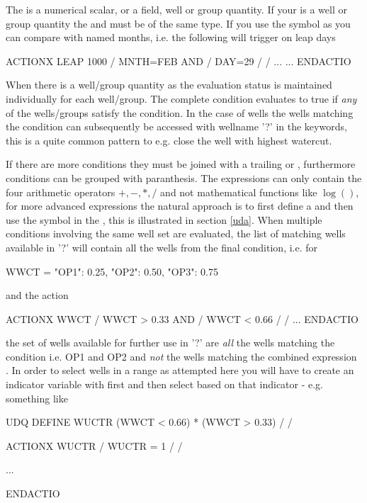 The  is a numerical scalar, or a field, well or group quantity.
If your  is a well or group quantity the  and
 must be of the same type. If you use the symbol  as
 you can compare with named months, i.e. the following will
trigger on leap days
\begin{deck}
ACTIONX
  LEAP 1000 /
  MNTH=FEB AND /
  DAY=29 /
/
...
...
ENDACTIO
\end{deck}
When there is a well/group quantity as  the evaluation status is
maintained individually for each well/group. The complete condition evaluates to
true if \emph{any} of the wells/groups satisfy the condition. In the case of
wells the wells matching the condition can subsequently be accessed with
wellname '?' in the  keywords, this is a quite common pattern to
e.g. close the well with highest watercut.

If there are more conditions they must be joined with a trailing  or
, furthermore conditions can be grouped with paranthesis. The \actionx{}
expressions can only contain the four arithmetic operators $+,-,*,/$ and not
mathematical functions like $\log()$, for more advanced expressions the natural
approach is to first define a \udq{} and then use the \udq{} symbol in the
\actionx{}, this is illustrated in section \ref{uda}. When multiple conditions
involving the same well set are evaluated, the list of matching wells available
in '?' will contain all the wells from the final condition, i.e. for
\begin{code}
 WWCT = {"OP1": 0.25, "OP2": 0.50, "OP3": 0.75}
\end{code}
and the action
\begin{deck}
ACTIONX
  WWCT /
  WWCT > 0.33 AND /
  WWCT < 0.66 /
/
...
ENDACTIO
\end{deck}
the set of wells available for further use in '?' are \emph{all} the wells
matching the condition  i.e. OP1 and OP2 and \emph{not}
the wells matching the combined expression . In
order to select wells in a range as attempted here you will have to create an
indicator variable with \udq{} first and then select based on that indicator -
e.g. something like
\begin{deck}
UDQ
  DEFINE WUCTR (WWCT < 0.66) * (WWCT > 0.33) /
/

ACTIONX
  WUCTR /
  WUCTR = 1 /
/

...

ENDACTIO
\end{deck}

